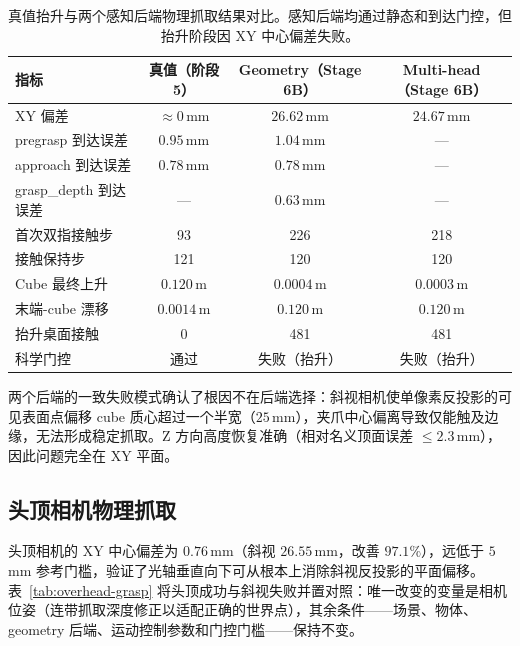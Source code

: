 \documentclass{l4proj}
\begin{document}
\begin{table}[htbp]
  \centering
  \caption{真值抬升与两个感知后端物理抓取结果对比。感知后端均通过静态和到达门控，但抬升阶段因 XY 中心偏差失败。}
  \label{tab:perception-grasp-results}
  \begin{tabular}{lccc}
    \toprule
    指标 & 真值（阶段 5） & Geometry（Stage 6B） & Multi-head（Stage 6B） \\
    \midrule
    XY 偏差 & $\approx0$\,mm & $26.62$\,mm & $24.67$\,mm \\
    pregrasp 到达误差 & $0.95$\,mm & $1.04$\,mm & --- \\
    approach 到达误差 & $0.78$\,mm & $0.78$\,mm & --- \\
    grasp\_depth 到达误差 & --- & $0.63$\,mm & --- \\
    首次双指接触步 & 93 & 226 & 218 \\
    接触保持步 & 121 & 120 & 120 \\
    Cube 最终上升 & $0.120$\,m & $0.0004$\,m & $0.0003$\,m \\
    末端-cube 漂移 & $0.0014$\,m & $0.120$\,m & $0.120$\,m \\
    抬升桌面接触 & 0 & 481 & 481 \\
    科学门控 & 通过 & 失败（抬升） & 失败（抬升） \\
    \bottomrule
  \end{tabular}
\end{table}

两个后端的一致失败模式确认了根因不在后端选择：斜视相机使单像素反投影的可见表面点偏移 cube 质心超过一个半宽（$25$\,mm），夹爪中心偏离导致仅能触及边缘，无法形成稳定抓取。Z 方向高度恢复准确（相对名义顶面误差 $\leq2.3$\,mm），因此问题完全在 XY 平面。

\subsection{头顶相机物理抓取}
头顶相机的 XY 中心偏差为 $0.76$\,mm（斜视 $26.55$\,mm，改善 $97.1\%$），远低于 $5$\,mm 参考门槛，验证了光轴垂直向下可从根本上消除斜视反投影的平面偏移。表~\ref{tab:overhead-grasp} 将头顶成功与斜视失败并置对照：唯一改变的变量是相机位姿（连带抓取深度修正以适配正确的世界点），其余条件——场景、物体、geometry 后端、运动控制参数和门控门槛——保持不变。
\end{document}
